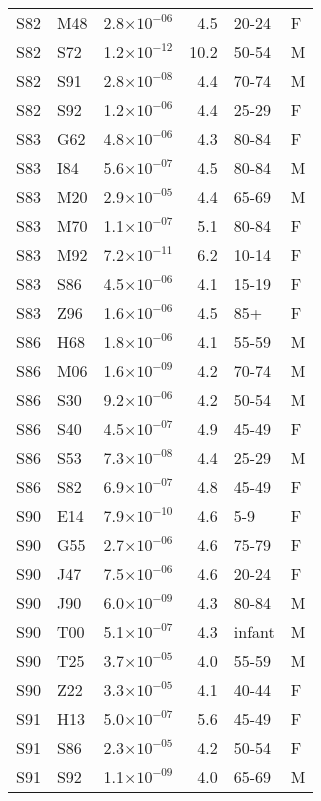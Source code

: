 \begin{longtable}{lllrll}
   S82 & M48 & 2.8$\times10^{-06}$ & 4.5 & 20-24 & F \\ 
   S82 & S72 & 1.2$\times10^{-12}$ & 10.2 & 50-54 & M \\ 
   S82 & S91 & 2.8$\times10^{-08}$ & 4.4 & 70-74 & M \\ 
   S82 & S92 & 1.2$\times10^{-06}$ & 4.4 & 25-29 & F \\ 
   S83 & G62 & 4.8$\times10^{-06}$ & 4.3 & 80-84 & F \\ 
   S83 & I84 & 5.6$\times10^{-07}$ & 4.5 & 80-84 & M \\ 
   S83 & M20 & 2.9$\times10^{-05}$ & 4.4 & 65-69 & M \\ 
   S83 & M70 & 1.1$\times10^{-07}$ & 5.1 & 80-84 & F \\ 
   S83 & M92 & 7.2$\times10^{-11}$ & 6.2 & 10-14 & F \\ 
   S83 & S86 & 4.5$\times10^{-06}$ & 4.1 & 15-19 & F \\ 
   S83 & Z96 & 1.6$\times10^{-06}$ & 4.5 & 85+ & F \\ 
   S86 & H68 & 1.8$\times10^{-06}$ & 4.1 & 55-59 & M \\ 
   S86 & M06 & 1.6$\times10^{-09}$ & 4.2 & 70-74 & M \\ 
   S86 & S30 & 9.2$\times10^{-06}$ & 4.2 & 50-54 & M \\ 
   S86 & S40 & 4.5$\times10^{-07}$ & 4.9 & 45-49 & F \\ 
   S86 & S53 & 7.3$\times10^{-08}$ & 4.4 & 25-29 & M \\ 
   S86 & S82 & 6.9$\times10^{-07}$ & 4.8 & 45-49 & F \\ 
   S90 & E14 & 7.9$\times10^{-10}$ & 4.6 & 5-9 & F \\ 
   S90 & G55 & 2.7$\times10^{-06}$ & 4.6 & 75-79 & F \\ 
   S90 & J47 & 7.5$\times10^{-06}$ & 4.6 & 20-24 & F \\ 
   S90 & J90 & 6.0$\times10^{-09}$ & 4.3 & 80-84 & M \\ 
   S90 & T00 & 5.1$\times10^{-07}$ & 4.3 & infant & M \\ 
   S90 & T25 & 3.7$\times10^{-05}$ & 4.0 & 55-59 & M \\ 
   S90 & Z22 & 3.3$\times10^{-05}$ & 4.1 & 40-44 & F \\ 
   S91 & H13 & 5.0$\times10^{-07}$ & 5.6 & 45-49 & F \\ 
   S91 & S86 & 2.3$\times10^{-05}$ & 4.2 & 50-54 & F \\ 
   S91 & S92 & 1.1$\times10^{-09}$ & 4.0 & 65-69 & M \\ 

\end{longtable}
